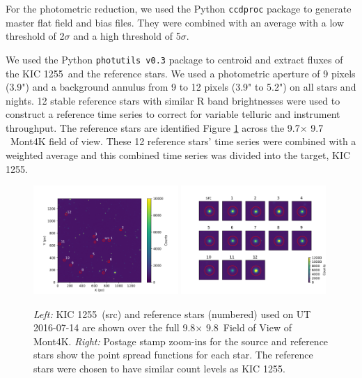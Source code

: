 \documentclass[preprint,trackchanges]{aastex61}
\newcommand{\shStar}{KIC 1255}
\begin{document}
For the photometric reduction, we used the Python \texttt{ccdproc} package \citep{craig2015ccdproc} to generate master flat field and bias files.
They were combined with an average with a low threshold of 2$\sigma$ and a high threshold of 5$\sigma$.

We used the Python \texttt{photutils v0.3} \citep{bradley2016photutilsv0p3} package to centroid and extract fluxes of the \shStar\ and the reference stars.
We used a photometric aperture of 9 pixels (3.9") and a background annulus from 9 to 12 pixels (3.9" to 5.2") on all stars and nights.
12 stable reference stars with similar R band brightnesses were used to construct a reference time series to correct for variable telluric and instrument throughput.
The reference stars are identified Figure \ref{fig:refStars} across the 9.7\arcmin $\times$ 9.7 \arcmin\ Mont4K field of view.
These 12 reference stars' time series were combined with a weighted average and this combined time series was divided into the target, \shStar.

\begin{figure}
\begin{centering}
\includegraphics[width=0.49\textwidth]{figure_index_152.pdf}
\includegraphics[width=0.49\textwidth]{stamps_kic1255_UT2016_07_14.pdf}
\caption{{\it Left:} \shStar\ (src) and reference stars (numbered) used on UT 2016-07-14 are shown over the full 9.8\arcmin $\times$ 9.8\arcmin\ Field of View of Mont4K.
{\it Right:} Postage stamp zoom-ins for the source and reference stars show the point spread functions for each star.
The reference stars were chosen to have similar count levels as \shStar.
}\label{fig:refStars}
\end{centering}
\end{figure}
\end{document}

